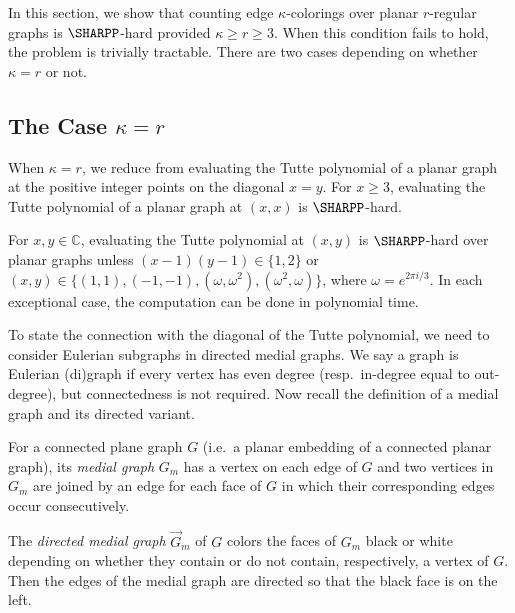 \documentclass[11pt]{article}
\begin{document}
In this section,
we show that counting edge $\kappa$-colorings over planar $r$-regular graphs is $\SHARPP$-hard provided $\kappa \ge r \ge 3$.
When this condition fails to hold,
the problem is trivially tractable.
There are two cases depending on whether $\kappa = r$ or not.

\subsection{The Case \texorpdfstring{$\kappa = r$}{kappa-equal-r}}

When $\kappa = r$,
we reduce from evaluating the Tutte polynomial of a planar graph at the positive integer points on the diagonal $x = y$.
For $x \ge 3$, evaluating the Tutte polynomial of a planar graph at $(x,x)$ is $\SHARPP$-hard.

\begin{theorem} \label{thm:tutte}
 For $x, y \in \mathbb{C}$,
 evaluating the Tutte polynomial at $(x,y)$ is $\SHARPP$-hard over planar graphs
 unless $(x - 1) (y - 1) \in \{1, 2\}$ or $(x,y) \in \{(1,1), (-1, -1), (\omega, \omega^2), (\omega^2, \omega)\}$,
 where $\omega = e^{2 \pi i / 3}$.
 In each exceptional case,
 the computation can be done in polynomial time.
\end{theorem}

To state the connection with the diagonal of the Tutte polynomial,
we need to consider Eulerian subgraphs in directed medial graphs.
We say a graph is Eulerian (di)graph if every vertex has even degree (resp.~in-degree equal to out-degree),
but connectedness is not required.
Now recall the definition of a medial graph and its directed variant.

\begin{definition}
 For a connected plane graph $G$ (i.e.~a planar embedding of a connected planar graph),
 its \emph{medial graph} $G_m$ has a vertex on each edge of $G$
 and two vertices in $G_m$ are joined by an edge for each face of $G$ in which their corresponding edges occur consecutively.
 
 The \emph{directed medial graph} $\vec{G}_m$ of $G$ colors the faces of $G_m$ black or white depending on whether they contain or do not contain, respectively,
 a vertex of $G$.
 Then the edges of the medial graph are directed so that the black face is on the left.
\end{definition}
\end{document}
